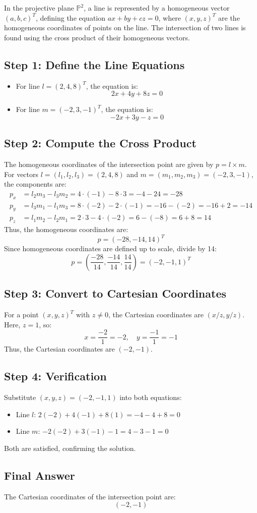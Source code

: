 In the projective plane \( \mathbb{P}^2 \), a line is represented by a homogeneous vector \( (a, b, c)^T \), defining the equation \( ax + by + cz = 0 \), where \( (x, y, z)^T \) are the homogeneous coordinates of points on the line. The intersection of two lines is found using the cross product of their homogeneous vectors.

\subsection*{Step 1: Define the Line Equations}
\begin{itemize}
    \item For line \( l = (2, 4, 8)^T \), the equation is:
    \[
    2x + 4y + 8z = 0
    \]
    \item For line \( m = (-2, 3, -1)^T \), the equation is:
    \[
    -2x + 3y - z = 0
    \]
\end{itemize}

\subsection*{Step 2: Compute the Cross Product}
The homogeneous coordinates of the intersection point are given by \( p = l \times m \). For vectors \( l = (l_1, l_2, l_3) = (2, 4, 8) \) and \( m = (m_1, m_2, m_3) = (-2, 3, -1) \), the components are:
\begin{align*}
    p_x &= l_2 m_3 - l_3 m_2 = 4 \cdot (-1) - 8 \cdot 3 = -4 - 24 = -28 \\
    p_y &= l_3 m_1 - l_1 m_3 = 8 \cdot (-2) - 2 \cdot (-1) = -16 - (-2) = -16 + 2 = -14 \\
    p_z &= l_1 m_2 - l_2 m_1 = 2 \cdot 3 - 4 \cdot (-2) = 6 - (-8) = 6 + 8 = 14
\end{align*}
Thus, the homogeneous coordinates are:
\[
p = (-28, -14, 14)^T
\]
Since homogeneous coordinates are defined up to scale, divide by 14:
\[
p = \left( \frac{-28}{14}, \frac{-14}{14}, \frac{14}{14} \right) = (-2, -1, 1)^T
\]

\subsection*{Step 3: Convert to Cartesian Coordinates}
For a point \( (x, y, z)^T \) with \( z \neq 0 \), the Cartesian coordinates are \( (x/z, y/z) \). Here, \( z = 1 \), so:
\[
x = \frac{-2}{1} = -2, \quad y = \frac{-1}{1} = -1
\]
Thus, the Cartesian coordinates are \( (-2, -1) \).

\subsection*{Step 4: Verification}
Substitute \( (x, y, z) = (-2, -1, 1) \) into both equations:
\begin{itemize}
    \item Line \( l \): \( 2(-2) + 4(-1) + 8(1) = -4 - 4 + 8 = 0 \)
    \item Line \( m \): \( -2(-2) + 3(-1) - 1 = 4 - 3 - 1 = 0 \)
\end{itemize}
Both are satisfied, confirming the solution.

\subsection*{Final Answer}
The Cartesian coordinates of the intersection point are:
\[
\boxed{(-2, -1)}
\]